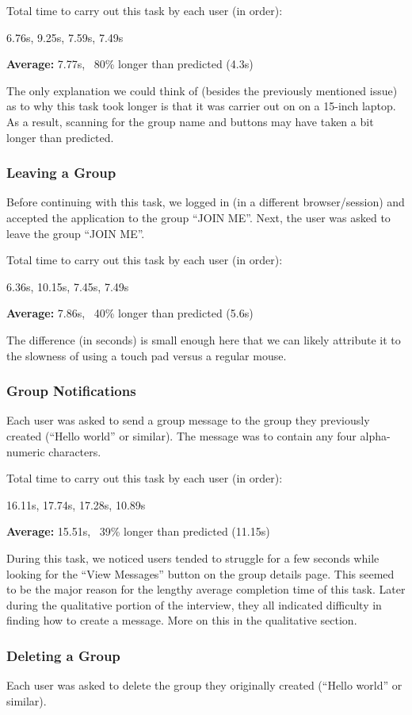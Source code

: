 \documentclass[conference]{IEEEtran}
\begin{document}
Total time to carry out this task by each user (in order):

6.76s, 9.25s, 7.59s, 7.49s

\textbf{Average:} 7.77s, ~80\% longer than predicted (4.3s)

The only explanation we could think of (besides the previously mentioned issue) as to why this task took longer is that it was carrier out on on a 15-inch laptop.  As a result, scanning for the group name and buttons may have taken a bit longer than predicted.

\subsubsection{Leaving a Group}
Before continuing with this task, we logged in (in a different browser/session) and accepted the application to the group ``JOIN ME''.  Next, the user was asked to leave the group ``JOIN ME''.

Total time to carry out this task by each user (in order):

6.36s, 10.15s, 7.45s, 7.49s

\textbf{Average:} 7.86s, ~40\% longer than predicted (5.6s)

The difference (in seconds) is small enough here that we can likely attribute it to the slowness of using a touch pad versus a regular mouse.

\subsubsection{Group Notifications}
Each user was asked to send a group message to the group they previously created (``Hello world'' or similar).  The message was to contain any four alpha-numeric characters.

Total time to carry out this task by each user (in order):

16.11s, 17.74s, 17.28s, 10.89s

\textbf{Average:} 15.51s, ~39\% longer than predicted (11.15s)

During this task, we noticed users tended to struggle for a few seconds while looking for the ``View Messages'' button on the group details page.  This seemed to be the major reason for the lengthy average completion time of this task.  Later during the qualitative portion of the interview, they all indicated difficulty in finding how to create a message.  More on this in the qualitative section.

\subsubsection{Deleting a Group}
Each user was asked to delete the group they originally created (``Hello world'' or similar).
\end{document}
